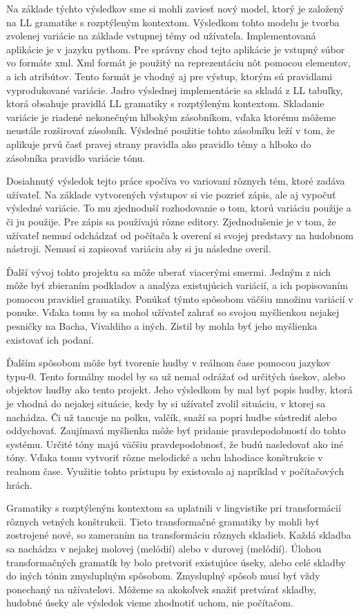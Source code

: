 Na základe týchto výsledkov sme si mohli zaviesť nový model, ktorý je založený na LL gramatike s rozptýleným kontextom. Výsledkom tohto modelu je tvorba zvolenej variácie na základe vstupnej témy od užívateľa. Implementovaná aplikácie je v jazyku pythom. Pre správny chod tejto aplikácie je vstupný súbor vo formáte xml. Xml formát je použitý na reprezentáciu nôt pomocou elementov, a ich atribútov. Tento formát je vhodný aj pre výstup, ktorým sú pravidlami vyprodukované variácie. Jadro výslednej implementácie sa skladá z LL tabuľky, ktorá obsahuje pravidlá LL gramatiky s rozptýleným kontextom. Skladanie variácie je riadené nekonečným hlbokým zásobníkom, vďaka ktorému môžeme neustále rozširovať zásobník. Výsledné použitie tohto zásobníku leží v tom, že aplikuje prvú časť pravej strany pravidla ako pravidlo témy a hlboko do zásobníka pravidlo variácie tónu.

Dosiahnutý výsledok tejto práce spočíva vo variovaní rôznych tém, ktoré zadáva užívateľ. Na základe vytvorených výstupov si vie pozrieť zápis, ale aj vypočuť výsledné variácie. To mu zjednoduší rozhodovanie o tom, ktorú variáciu použije a či ju použije. Pre zápis sa používajú rôzne editory. Zjednodušenie je v tom, že užívateľ nemusí odchádzať od počítača k overení si svojej predstavy na hudobnom nástroji. Nemusí si zapisovať variáciu aby si ju následne overil.

Ďalší vývoj tohto projektu sa môže uberať viacerými smermi. Jedným z nich môže byť zbieraním podkladov a analýza existujúcich variácií, a ich popisovaním pomocou pravidiel gramatiky. Ponúkať týmto spôsobom väčšiu množinu variácií v ponuke. Vďaka tomu by sa mohol užívateľ zahrať so svojou myšlienkou nejakej pesničky na Bacha, Vivaldiho a iných. Zistil by mohla byť jeho myšlienka existovať ich podaní.

Ďalším spôsobom môže byť tvorenie hudby v reálnom čase pomocou jazykov typu-0. Tento formálny model by sa už nemal odrážať od určitých úsekov, alebo objektov hudby ako tento projekt. Jeho výsledkom by mal byť popis hudby, ktorá je vhodná do nejakej situácie, kedy by si užívateľ zvolil situáciu, v ktorej sa nachádza. Či už tancuje na polku, valčík, snaží sa popri hudbe sústrediť alebo oddychovať. Zaujímavá myšlienka môže byť pridanie pravdepodobností do tohto systému. Určité tóny majú väčšiu pravdepodobnosť, že budú nasledovať ako iné tóny. Vďaka tomu vytvoriť rôzne melodické a uchu lahodiace konštrukcie v realnom čase. Využitie tohto prístupu by existovalo aj napríklad v počítačových hrách. 

Gramatiky s rozptýleným kontextom sa uplatnili v lingvistike pri transformácií rôznych vetných konštrukcii. Tieto transformačné gramatiky by mohli byť zostrojené nové, so zameraním na transformáciu rôznych skladieb. Každá skladba sa nachádza v nejakej molovej (melódií) alebo v durovej (melódií). Úlohou transformačných gramatík by bolo pretvoriť existujúce úseky, alebo celé skladby do iných tónin zmysluplným spôsobom. Zmysluplný spôsob musí byť vždy ponechaný na užívateľovi. Môžeme sa akokoľvek snažiť pretvárať skladby, hudobné úseky ale výsledok vieme zhodnotiť uchom, nie počítačom.



